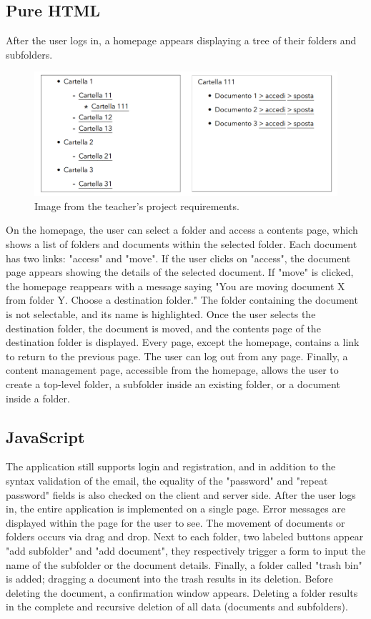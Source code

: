 \documentclass[a4paper,12pt]{article}
\begin{document}
\subsection{Pure HTML}
After the user logs in, a homepage appears displaying a tree of their folders and subfolders.
\begin{figure}[h]
    \centering
    \includegraphics[width=1.0\textwidth]{HTML/HTMLTree.png}
    \caption{Image from the teacher's project requirements.}
    \label{fig:HTMLTree}
\end{figure}
On the homepage, the user can select a folder and access a contents page, which shows a list of folders and documents within the selected folder. Each document has two links: "access" and "move". If the user clicks on "access", the document page appears showing the details of the selected document. If "move" is clicked, the homepage reappears with a message saying "You are moving document X from folder Y. Choose a destination folder." The folder containing the document is not selectable, and its name is highlighted. Once the user selects the destination folder, the document is moved, and the contents page of the destination folder is displayed. Every page, except the homepage, contains a link to return to the previous page. The user can log out from any page. Finally, a content management page, accessible from the homepage, allows the user to create a top-level folder, a subfolder inside an existing folder, or a document inside a folder.

\newpage
\subsection{JavaScript}
The application still supports login and registration, and in addition to the syntax validation of the email, the equality of the "password" and "repeat password" fields is also checked on the client and server side. After the user logs in, the entire application is implemented on a single page. Error messages are displayed within the page for the user to see. The movement of documents or folders occurs via drag and drop. Next to each folder, two labeled buttons appear "add subfolder" and "add document", they respectively trigger a form to input the name of the subfolder or the document details. Finally, a folder called "trash bin" is added; dragging a document into the trash results in its deletion. Before deleting the document, a confirmation window appears. Deleting a folder results in the complete and recursive deletion of all data (documents and subfolders).
\end{document}
